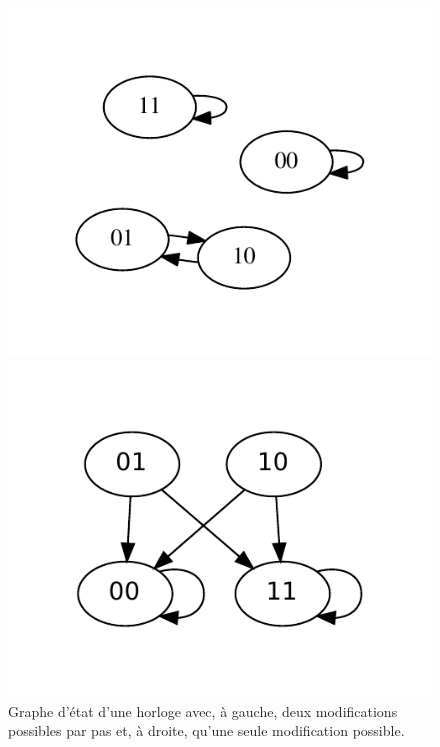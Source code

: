 \documentclass[11pt, a4paper]{article}
\begin{document}
\begin{figure}[position]
    \begin{center}
        \begin{minipage}[c]{.49\linewidth}
            \centering
            \includegraphics[scale=0.85]{bool_net_async}
        \end{minipage}
        \hfill
        \begin{minipage}[c]{.49\linewidth}
            \centering
            \includegraphics[scale=0.85]{bool_net_sync}
        \end{minipage}
        \caption{
            \label{ex_diff_sync}
            Graphe d'état d'une horloge avec, à gauche, deux modifications
            possibles par pas et, à droite, qu'une seule modification possible.
        }
    \end{center}
\end{figure}
\end{document}

